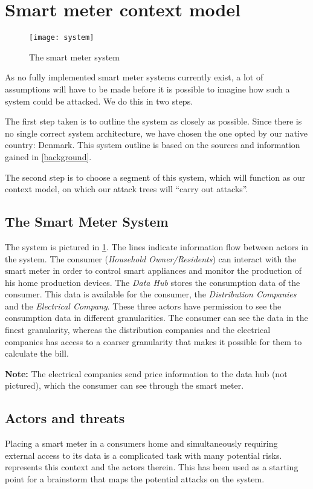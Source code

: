 \section{Smart meter context model}

\begin{figure}[h]
  \texttt{[image: system]}
  \caption{The smart meter system\cite{tdlm}}
  \label{contextual:system}
\end{figure}

As no fully implemented smart meter systems currently exist, a lot of assumptions will have to be made before it is possible to imagine how such a system could be attacked.
We do this in two steps.

The first step taken is to outline the system as closely as possible.
Since there is no single correct system architecture, we have chosen the one opted by our native country: Denmark.
This system outline is based on the sources and information gained in \cref{background}.

The second step is to choose a segment of this system, which will function as our context model, on which our attack trees will ``carry out attacks''.

\subsection{The Smart Meter System}
The system is pictured in \cref{contextual:system}.
The lines indicate information flow between actors in the system.
The consumer (\textit{Household Owner/Residents}) can interact with the smart meter in order to control smart appliances and monitor the production of his home production devices.
The \textit{Data Hub} stores the consumption data of the consumer.
This data is available for the consumer, the \textit{Distribution Companies} and the \textit{Electrical Company}.
These three actors have permission to see the consumption data in different granularities.
The consumer can see the data in the finest granularity, whereas the distribution companies and the electrical companies has access to a coarser granularity that makes it possible for them to calculate the bill.

\textbf{Note:} The electrical companies send price information to the data hub (not pictured), which the consumer can see through the smart meter.

\subsection{Actors and threats}
Placing a smart meter in a consumers home and simultaneously requiring external access to its data is a complicated task with many potential risks.
 represents this context and the actors therein.
This has been used as a starting point for a brainstorm that maps the potential attacks on the system.

